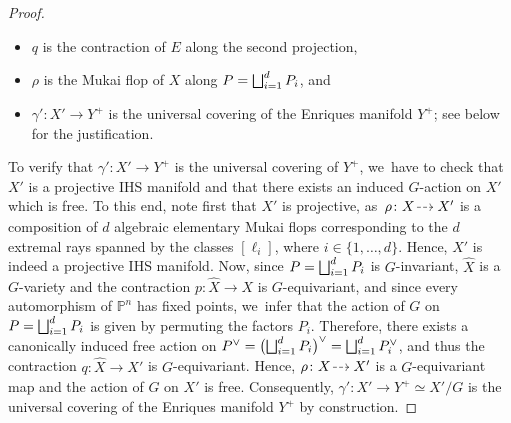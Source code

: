 \documentclass[JEP,XML,SOM,Unicode,published]{cedram}
\let\oldbigsqcup\bigsqcup
\renewcommand{\bigsqcup}{\mathop{\textstyle\oldbigsqcup}\displaylimits}
\newcommand{\dradpl}{{\hspace*{-2.5mm}\begin{tikzcd}[ampersand replacement=\&,column sep = scriptsize]\mbox{}\ar[r,dashed]\&\mbox{}\end{tikzcd}\hspace*{-2.5mm}}}
\newcommand{\dratst}{{\hspace*{-2.5mm}\begin{tikzcd}[ampersand replacement=\&,column sep = small]\mbox{}\ar[r,dashed]\&\mbox{}\end{tikzcd}\hspace*{-2mm}}}
\let\drascst\dratst
\newcommand{\dra}{\mathchoice{\dradpl}{\dratst}{\drascst}{\drascst}}
\theoremstyle{plain}
\theoremstyle{definition}
\renewcommand{\P}{\mathbb{P}}
\begin{document}
\begin{proof}
\begin{itemize}
\item
$q$ is the contraction of $E$ along the second projection,

\item
$\rho$ is the Mukai flop of $X$ along $P = \bigsqcup_{i=1}^d P_i$, and

\item
$\gamma' \colon X' \to Y^+$ is the universal covering of the Enriques manifold $Y^+$; see below for the justification.
\end{itemize}
To verify that $\gamma' \colon X'\to Y^+$ is the universal covering of $Y^+$, we~have to check that $X'$ is a projective IHS manifold and that there exists an induced $G$\nobreakdash-action on $X'$ which is free. To this end, note first that $X'$ is projective, as~$\rho \colon X \dra X'$ is a composition of $d$ algebraic elementary Mukai flops corresponding to the $d$ extremal rays spanned by the classes $[\ell_i]$, where $i \in \{ 1, \dots, d \}$. Hence, $X'$ is indeed a projective IHS manifold. Now, since $P = \bigsqcup_{i=1}^d P_i$ is $G$\nobreakdash-invariant, $\widehat{X}$ is a $G$\nobreakdash-variety and the contraction $p \colon \widehat{X} \to X$ is $G$\nobreakdash-equivariant, and since every automorphism of $\P^n$ has fixed points, we~infer that the action of $G$ on $P = \bigsqcup_{i=1}^d P_i$ is given by permuting the factors $P_i$.
Therefore, there exists a canonically induced free action on $P^\vee = \bigl(\bigsqcup_{i=1}^d P_i \bigr)^\vee = \bigsqcup_{i=1}^d P_i^\vee$, and thus the contraction $q \colon \widehat{X} \to X'$ is $G$\nobreakdash-equivariant. Hence, $\rho \colon X \dra X'$ is a $G$\nobreakdash-equivariant map and the action of $G$ on $X'$ is free.
Consequently, $\gamma'\colon X'\to Y^+ \simeq X'/G$ is the universal covering of the Enriques manifold $Y^+$ by construction.


\end{proof}
\end{document}

